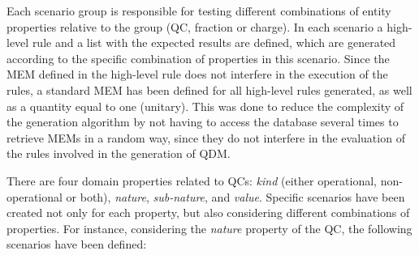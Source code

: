 
Each scenario group is responsible for testing different combinations of entity properties relative to the group (QC, fraction or charge). In each scenario a high-level rule and a list with the expected results are defined, which are generated according to the specific combination of properties in this scenario. Since the MEM defined in the high-level rule does not interfere in the execution of the rules, a standard MEM has been defined for all high-level rules generated, as well as a quantity equal to one (unitary). This was done to reduce the complexity of the generation algorithm by not having to access the database several times to retrieve MEMs in a random way, since they do not interfere in the evaluation of the rules involved in the generation of QDM.


There are four domain properties related to QCs:
\emph{kind} (either operational, non-operational or both),
\emph{nature}, \emph{sub-nature}, and \emph{value}. Specific scenarios have been created not only for each property, but also considering different
combinations of properties. For instance, considering the \emph{nature} property of the QC,
the following scenarios have been defined:

